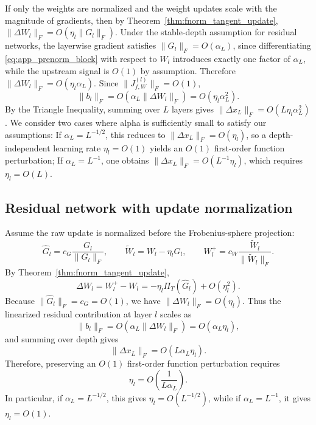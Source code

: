 \documentclass{article}
\begin{document}
If only the weights are normalized and the weight updates scale with the magnitude of gradients, then by Theorem~\ref{thm:fnorm_tangent_update},
$\|\Delta W_l\|_F = O(\eta_l \|G_l\|_F)$.
Under the stable-depth assumption for residual networks, the layerwise gradient satisfies
$\|G_l\|_F = O(\alpha_L)$,
since differentiating \eqref{eq:app_prenorm_block} with respect to $W_l$ introduces exactly one factor of $\alpha_L$, while the upstream signal is $O(1)$ by assumption. Therefore
$\|\Delta W_l\|_F = O(\eta_l \alpha_L)$.
Since $\|J_{f,W}^{(l)}\|_F=O(1)$,
\begin{equation}
\|b_l\|_F
=
O(\alpha_L \|\Delta W_l\|_F)
=
O(\eta_l \alpha_L^2).
\end{equation}
By the Triangle Inequality, summing over $L$ layers gives
$\|\Delta x_L\|_F = O(L \eta_l \alpha_L^2)$.
We consider two cases where alpha is sufficiently small to satisfy our assumptions: If $\alpha_L=L^{-1/2}$, this reduces to $\|\Delta x_L\|_F = O(\eta_l)$,
so a depth-independent learning rate $\eta_l=O(1)$ yields an $O(1)$ first-order function perturbation; If $\alpha_L=L^{-1}$, one obtains
$\|\Delta x_L\|_F = O(L^{-1}\eta_l)$,
which requires $\eta_l=O(L)$.

\subsection{Residual network with update normalization}

Assume the raw update is normalized before the Frobenius-sphere projection:
\begin{equation}
\widehat G_l = c_G \frac{G_l}{\|G_l\|_F},
\qquad
\widetilde W_l = W_l - \eta_l \widehat G_l,
\qquad
W_l^{+} = c_W \frac{\widetilde W_l}{\|\widetilde W_l\|_F}.
\end{equation}
By Theorem~\ref{thm:fnorm_tangent_update},
\begin{equation}
\Delta W_l
=
W_l^{+}-W_l
=
-\eta_l \Pi_T(\widehat G_l) + O(\eta_l^2).
\end{equation}
Because \(\|\widehat G_l\|_F=c_G=O(1)\), we have
$
\|\Delta W_l\|_F = O(\eta_l).
$
Thus the linearized residual contribution at layer \(l\) scales as
\begin{equation}
\|b_l\|_F
=
O(\alpha_L \|\Delta W_l\|_F)
=
O(\alpha_L \eta_l),
\end{equation}
and summing over depth gives
\begin{equation}
\|\Delta x_L\|_F = O(L\alpha_L\eta_l).
\end{equation}
Therefore, preserving an \(O(1)\) first-order function perturbation requires
\begin{equation}
\eta_l = O\!\left(\frac{1}{L\alpha_L}\right).
\end{equation}
In particular, if $\alpha_L=L^{-1/2}$, this gives $\eta_l = O(L^{-1/2})$,
while if $\alpha_L=L^{-1}$, it gives $\eta_l = O(1)$.
\end{document}

